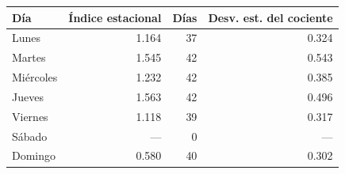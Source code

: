 \begin{tabular}{lrrr}
\toprule
Día & Índice estacional & Días & Desv. est. del cociente \\
\midrule
Lunes & 1.164 & 37 & 0.324 \\
Martes & 1.545 & 42 & 0.543 \\
Miércoles & 1.232 & 42 & 0.385 \\
Jueves & 1.563 & 42 & 0.496 \\
Viernes & 1.118 & 39 & 0.317 \\
Sábado & --- & 0 & --- \\
Domingo & 0.580 & 40 & 0.302 \\
\bottomrule
\end{tabular}

